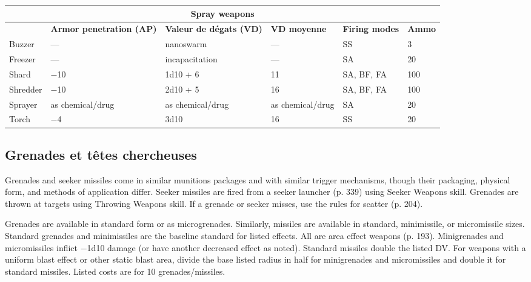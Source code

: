 \begin{table} \begin{tabularx}{\textwidth}{|l|X|l|l|l|l|} \hline

\multicolumn{6}{|c|}{\textbf{Spray weapons}} \\ \hline

&\textbf{Armor penetration (AP)}	&\textbf{Valeur de dégats (VD)}	&\textbf{VD moyenne}	&\textbf{Firing modes}	&\textbf{Ammo} \\ \hline

Buzzer	&--- &nanoswarm	&--- &SS	&3 \\ \hline

Freezer	&--- &incapacitation	&--- &SA	&20 \\ \hline

Shard	&$-$10	&1d10 + 6	&11	&SA, BF, FA	&100 \\ \hline

Shredder	&$-$10	&2d10 + 5	&16	&SA, BF, FA	&100 \\ \hline

Sprayer	&as chemical/drug	&as chemical/drug	&as chemical/drug	&SA	&20 \\ \hline

Torch	&$-$4	&3d10	&16	&SS	&20 \\ \hline

\end{tabularx} \label{tab:spray-weapons} \end{table} 

\subsection{Grenades et têtes chercheuses} \label{sec:grenades-seekers} 

Grenades and seeker missiles come in similar munitions packages and with similar trigger mechanisms, though their packaging, physical form, and methods of application differ. Seeker missiles are fired from a seeker launcher (p. 339) using Seeker Weapons skill. Grenades are thrown at targets using Throwing Weapons skill. If a grenade or seeker misses, use the rules for scatter (p. 204). 

Grenades are available in standard form or as microgrenades. Similarly, missiles are available in standard, minimissile, or micromissile sizes. Standard grenades and minimissiles are the baseline standard for listed effects. All are area effect weapons (p. 193). Minigrenades and micromissiles inflict $-$1d10 damage (or have another decreased effect as noted). Standard missiles double the listed DV. For weapons with a uniform blast effect or other static blast area, divide the base listed radius in half for minigrenades and micromissiles and double it for standard missiles. Listed costs are for 10 grenades/missiles. 

